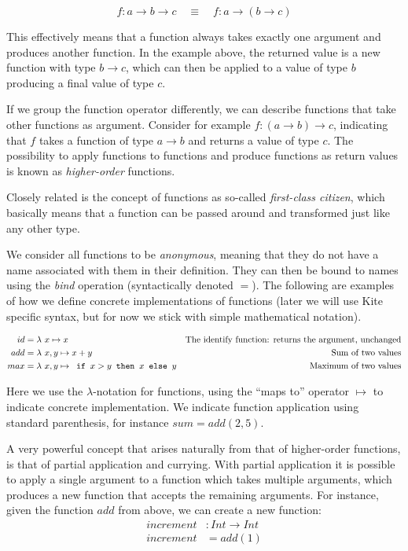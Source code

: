 \[ f: a \to b \to c \quad \equiv \quad f: a \to (b \to c) \]

This effectively means that a function always takes exactly one argument and produces another function. In the example above, the returned value is a new function with type $b \to c$, which can then be applied to a value of type $b$ producing a final value of type $c$.

If we group the function operator differently, we can describe functions that take other functions as argument. Consider for example $f: (a \to b) \to c$, indicating that $f$ takes a function of type $a \to b$ and returns a value of type $c$. The possibility to apply functions to functions and produce functions as return values is known as \emph{higher-order} functions.

Closely related is the concept of functions as so-called \emph{first-class citizen}, which basically means that a function can be passed around and transformed just like any other type.

We consider all functions to be \emph{anonymous}, meaning that they do not have a name associated with them in their definition. They can then be bound to names using the \emph{bind} operation (syntactically denoted $=$). The following are examples of how we define concrete implementations of functions (later we will use Kite specific syntax, but for now we stick with simple mathematical notation).

\begin{align*}
id &= \lambda{} \ x \mapsto{} x & \text{The identify function: returns the argument, unchanged}\\
add &= \lambda{} \  x, y  \mapsto{}  x + y   & \text{Sum of two values}\\
max &= \lambda{} \  x, y  \mapsto{}  \texttt{ if } x > y \texttt{ then } x \texttt{ else } y   & \text{Maximum of two values}\\
\end{align*}

Here we use the $\lambda$-notation for functions, using the ``maps to'' operator $\mapsto$ to indicate concrete implementation. We indicate function application using standard parenthesis, for instance $sum = add(2, 5)$.

A very powerful concept that arises naturally from that of higher-order functions, is that of partial application and currying. With partial application it is possible to apply a single argument to a function which takes multiple arguments, which produces a new function that accepts the remaining arguments. For instance, given the function $add$ from above, we can create a new function:
\begin{align*}
increment &: Int \to Int\\
increment &= add(1)
\end{align*}

